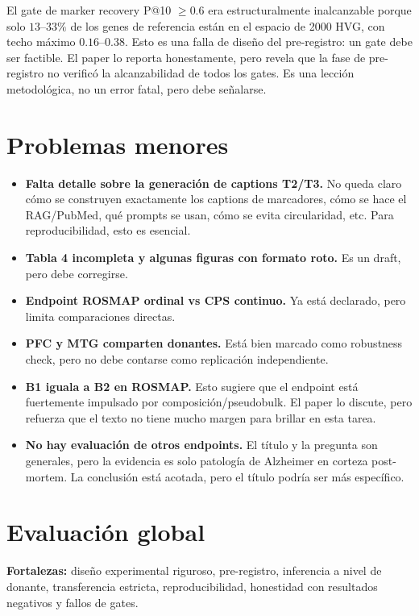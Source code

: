 \documentclass[11pt,a4paper]{article}
\begin{document}
El gate de marker recovery P@10 $\geq 0.6$ era estructuralmente inalcanzable porque solo $13$--$33\%$ de los genes de referencia están en el espacio de 2000 HVG, con techo máximo $0.16$--$0.38$. Esto es una falla de diseño del pre-registro: un gate debe ser factible. El paper lo reporta honestamente, pero revela que la fase de pre-registro no verificó la alcanzabilidad de todos los gates. Es una lección metodológica, no un error fatal, pero debe señalarse.

\section*{Problemas menores}

\begin{itemize}
    \item \textbf{Falta detalle sobre la generación de captions T2/T3.} No queda claro cómo se construyen exactamente los captions de marcadores, cómo se hace el RAG/PubMed, qué prompts se usan, cómo se evita circularidad, etc. Para reproducibilidad, esto es esencial.
    \item \textbf{Tabla 4 incompleta y algunas figuras con formato roto.} Es un draft, pero debe corregirse.
    \item \textbf{Endpoint ROSMAP ordinal vs CPS continuo.} Ya está declarado, pero limita comparaciones directas.
    \item \textbf{PFC y MTG comparten donantes.} Está bien marcado como robustness check, pero no debe contarse como replicación independiente.
    \item \textbf{B1 iguala a B2 en ROSMAP.} Esto sugiere que el endpoint está fuertemente impulsado por composición/pseudobulk. El paper lo discute, pero refuerza que el texto no tiene mucho margen para brillar en esta tarea.
    \item \textbf{No hay evaluación de otros endpoints.} El título y la pregunta son generales, pero la evidencia es solo patología de Alzheimer en corteza post-mortem. La conclusión está acotada, pero el título podría ser más específico.
\end{itemize}

\section*{Evaluación global}

\textbf{Fortalezas:} diseño experimental riguroso, pre-registro, inferencia a nivel de donante, transferencia estricta, reproducibilidad, honestidad con resultados negativos y fallos de gates.
\end{document}
